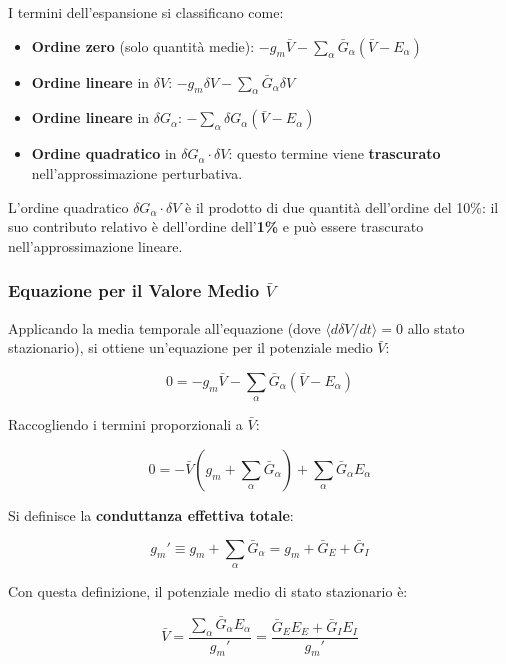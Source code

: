 I termini dell'espansione si classificano come:
\begin{itemize}
    \item \textbf{Ordine zero} (solo quantità medie): $-g_m \bar{V} - \sum_\alpha \bar{G}_\alpha(\bar{V} - E_\alpha)$
    \item \textbf{Ordine lineare} in $\delta V$: $-g_m \delta V - \sum_\alpha \bar{G}_\alpha \delta V$
    \item \textbf{Ordine lineare} in $\delta G_\alpha$: $-\sum_\alpha \delta G_\alpha(\bar{V} - E_\alpha)$
    \item \textbf{Ordine quadratico} in $\delta G_\alpha \cdot \delta V$: questo termine viene \textbf{trascurato} nell'approssimazione perturbativa.
\end{itemize}

L'ordine quadratico $\delta G_\alpha \cdot \delta V$ è il prodotto di due quantità dell'ordine del 10\%: il suo contributo relativo è dell'ordine dell'\textbf{1\%} e può essere trascurato nell'approssimazione lineare.

\subsubsection{Equazione per il Valore Medio $\bar{V}$}

Applicando la media temporale all'equazione (dove $\langle d\delta V/dt \rangle = 0$ allo stato stazionario), si ottiene un'equazione per il potenziale medio $\bar{V}$:

\begin{equation}
0 = -g_m \bar{V} - \sum_\alpha \bar{G}_\alpha(\bar{V} - E_\alpha)
\end{equation}

Raccogliendo i termini proporzionali a $\bar{V}$:

\begin{equation}
0 = -\bar{V}\left(g_m + \sum_\alpha \bar{G}_\alpha\right) + \sum_\alpha \bar{G}_\alpha E_\alpha
\end{equation}

Si definisce la \textbf{conduttanza effettiva totale}:

\begin{equation}
\boxed{g_m' \equiv g_m + \sum_\alpha \bar{G}_\alpha = g_m + \bar{G}_E + \bar{G}_I}
\end{equation}

Con questa definizione, il potenziale medio di stato stazionario è:

\begin{equation}
\bar{V} = \frac{\sum_\alpha \bar{G}_\alpha E_\alpha}{g_m'} = \frac{\bar{G}_E E_E + \bar{G}_I E_I}{g_m'}
\end{equation}

